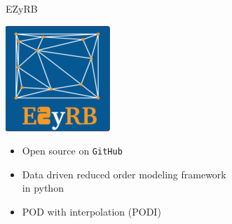 \begin{frame}{EZyRB}
	\Large{}
	\normalsize
	
	\vspace{3mm} \hspace{82mm}
	\begin{minipage}{0.25\textwidth}
		\includegraphics[width=\textwidth]{img/logo_EZyRB_small.png}
	\end{minipage}
	\vspace{-28mm}\hspace{2mm}
	\begin{itemize}
		\item Open source on \texttt{GitHub}
		\item Data driven reduced order modeling framework \\ in python
		\item POD with interpolation (PODI)
	\end{itemize}

	
	
\end{frame}

